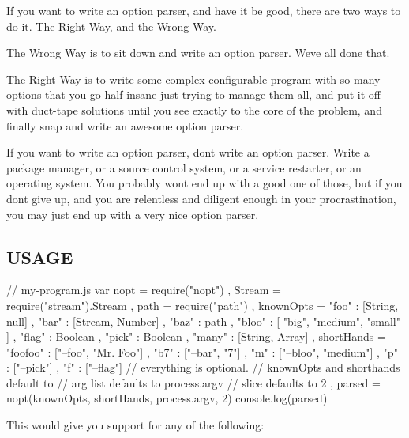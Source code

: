 If you want to write an option parser, and have it be good, there are two ways to do it. The Right Way, and the Wrong Way.

The Wrong Way is to sit down and write an option parser. We\textquotesingle{}ve all done that.

The Right Way is to write some complex configurable program with so many options that you go half-\/insane just trying to manage them all, and put it off with duct-\/tape solutions until you see exactly to the core of the problem, and finally snap and write an awesome option parser.

If you want to write an option parser, don\textquotesingle{}t write an option parser. Write a package manager, or a source control system, or a service restarter, or an operating system. You probably won\textquotesingle{}t end up with a good one of those, but if you don\textquotesingle{}t give up, and you are relentless and diligent enough in your procrastination, you may just end up with a very nice option parser.

\subsection*{U\+S\+A\+G\+E}

\begin{DoxyVerb}// my-program.js
var nopt = require("nopt")
  , Stream = require("stream").Stream
  , path = require("path")
  , knownOpts = { "foo" : [String, null]
                , "bar" : [Stream, Number]
                , "baz" : path
                , "bloo" : [ "big", "medium", "small" ]
                , "flag" : Boolean
                , "pick" : Boolean
                , "many" : [String, Array]
                }
  , shortHands = { "foofoo" : ["--foo", "Mr. Foo"]
                 , "b7" : ["--bar", "7"]
                 , "m" : ["--bloo", "medium"]
                 , "p" : ["--pick"]
                 , "f" : ["--flag"]
                 }
             // everything is optional.
             // knownOpts and shorthands default to {}
             // arg list defaults to process.argv
             // slice defaults to 2
  , parsed = nopt(knownOpts, shortHands, process.argv, 2)
console.log(parsed)
\end{DoxyVerb}


This would give you support for any of the following\+:


